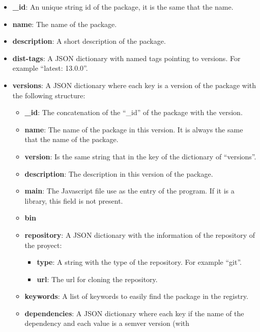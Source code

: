 \documentclass[letterpaper,12pt]{report}
\begin{document}
\begin{itemize}
    \item \textbf{\_id}: An unique string id of the package, it is the same that the
        name.
    \item \textbf{name}: The name of the package.
    \item \textbf{description}: A short description of the package.
    \item \textbf{dist-tags}: A JSON dictionary with named tags pointing to versions.
        For example ``latest: 13.0.0''.
    \item \textbf{versions}: A JSON dictionary where each key is a version of the
        package with the following structure:
        \begin{itemize}
            \item \textbf{\_id}: The concatenation of the ``\_id'' of the package
                with the version.
            \item \textbf{name}: The name of the package in this version. It is
                always the same that the name of the package.
            \item  \textbf{version}: Is the same string that in the key of the
                dictionary of ``versions''.
            \item \textbf{description}: The description in this version of the
                package.
            \item \textbf{main}: The Javascript file use as the entry of the program.
                If it is a library, this field is not present.
            \item \textbf{bin}
            \item \textbf{repository}: A JSON dictionary with the information of
                the repository of the proyect:
                \begin{itemize}
                    \item \textbf{type}: A string with the type of the
                        repository. For example ``git''.
                    \item \textbf{url}: The url for cloning the repository.
                \end{itemize}
            \item \textbf{keywords}: A list of keywords to easily find the
                package in the registry.
            \item \textbf{dependencies}: A JSON dictionary where each key if the
                name of the dependency and each value is a semver version (with

\end{itemize}
\end{itemize}
\end{document}
